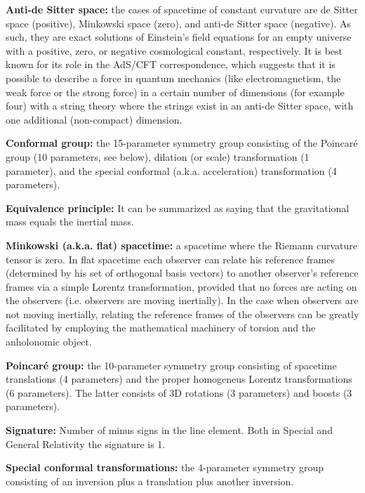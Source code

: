 \begin{list}{}{}
	\item \textbf{Anti-de Sitter space:} the cases of spacetime of constant curvature are de Sitter space (positive), Minkowski space (zero), and anti-de Sitter space (negative). As such, they are exact solutions of Einstein's field equations for an empty universe with a positive, zero, or negative cosmological constant, respectively. It is best known for its role in the AdS/CFT correspondence, which suggests that it is possible to describe a force in quantum mechanics (like electromagnetism, the weak force or the strong force) in a certain number of dimensions (for example four) with a string theory where the strings exist in an anti-de Sitter space, with one additional (non-compact) dimension.
	
	\item \textbf{Conformal group:} the 15-parameter symmetry group consisting of the Poincaré group (10 parameters, see below), dilation (or scale) transformation (1 parameter), and the special conformal (a.k.a. acceleration) transformation (4 parameters).
	
	\item \textbf{Equivalence principle:} It can be summarized as saying that the gravitational mass equals the inertial mass.
	
	\item \textbf{Minkowski (a.k.a. flat) spacetime:} a spacetime where the Riemann curvature tensor is zero. In flat spacetime each observer can relate his reference frames (determined by his set of orthogonal basis vectors) to another observer's reference frames via a simple Lorentz transformation, provided that no forces are acting on the observers (i.e. observers are moving inertially). In the case when observers are not moving inertially, relating the reference frames of the observers can be greatly facilitated by employing the mathematical machinery of torsion and the anholonomic object.
	
	\item \textbf{Poincaré group:} the 10-parameter symmetry group consisting of spacetime translations (4 parameters) and the proper homogeneus Lorentz transformations (6 parameters). The latter consists of 3D rotations (3 parameters) and boosts (3 parameters).
	
	\item \textbf{Signature:} Number of minus signs in the line element. Both in Special and General Relativity the signature is 1.
	
	\item \textbf{Special conformal transformations:} the 4-parameter symmetry group consisting of an inversion plus a translation plus another inversion.
\end{list}
